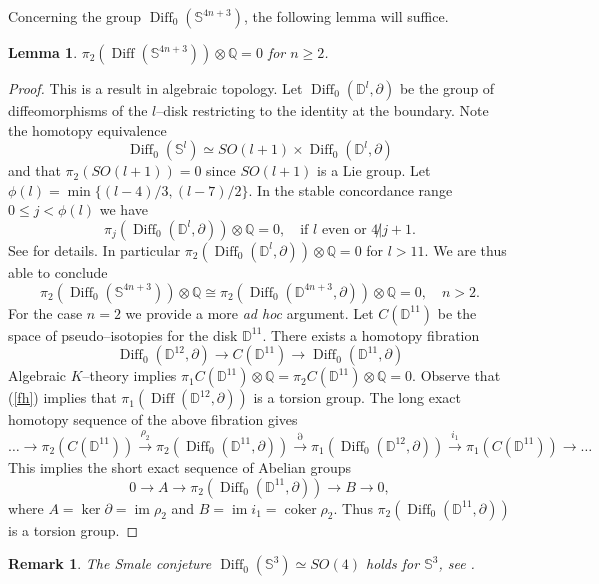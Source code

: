 \documentclass[10pt]{amsart}
\newtheorem{lemma}[proposition]{Lemma}
\newtheorem{remark}[proposition]{Remark}
\begin{document}
\noindent Concerning the group ${\operatorname{Diff}}_0({\mathbb{S}}^{4n+3})$, the following lemma will suffice.
\begin{lemma}\label{lem:tor}
$\pi_2({\operatorname{Diff}}({\mathbb{S}}^{4n+3}))\otimes{\mathbb{Q}}=0$ for $n\geq 2$.
\end{lemma}
\begin{proof}
This is a result in algebraic topology. Let ${\operatorname{Diff}}_0({\mathbb{D}}^l,\partial)$ be the group of diffeomorphisms of the $l$--disk restricting to the identity at the boundary. Note the homotopy equivalence
$${\operatorname{Diff}}_0({\mathbb{S}}^l)\simeq SO(l+1)\times{\operatorname{Diff}}_0({\mathbb{D}}^l,\partial)$$
and that $\pi_2(SO(l+1))=0$ since $SO(l+1)$ is a Lie group. Let $\phi(l)=\min\{(l-4)/3,(l-7)/2\}$. In the stable concordance range $0\leq j<\phi(l)$ we have
\begin{equation}\label{fh}
\pi_j({\operatorname{Diff}}_0({\mathbb{D}}^l,\partial))\otimes{\mathbb{Q}}=0,\quad\mbox{if }l\mbox{ even or }4\not|j+1.
\end{equation}
See \cite{We} for details. In particular $\pi_2({\operatorname{Diff}}_0({\mathbb{D}}^l,\partial))\otimes{\mathbb{Q}}=0$ for $l>11$. We are thus able to conclude
$$\pi_2({\operatorname{Diff}}_0({\mathbb{S}}^{4n+3}))\otimes{\mathbb{Q}}\cong\pi_2({\operatorname{Diff}}_0({\mathbb{D}}^{4n+3},\partial))\otimes{\mathbb{Q}}=0,\quad n>2.$$
For the case $n=2$ we provide a more {\it ad hoc} argument. Let $C({\mathbb{D}}^{11})$ be the space of pseudo--isotopies for the disk ${\mathbb{D}}^{11}$. There exists a homotopy fibration
$${\operatorname{Diff}}_0({\mathbb{D}}^{12},\partial)\longrightarrow C({\mathbb{D}}^{11})\longrightarrow{\operatorname{Diff}}_0({\mathbb{D}}^{11},\partial)$$
Algebraic $K$--theory implies $\pi_1C({\mathbb{D}}^{11})\otimes{\mathbb{Q}}=\pi_2C({\mathbb{D}}^{11})\otimes{\mathbb{Q}}=0$. Observe that (\ref{fh}) implies that $\pi_1({\operatorname{Diff}}({\mathbb{D}}^{12},\partial))$ is a torsion group. The long exact homotopy sequence of the above fibration gives
$$\ldots\longrightarrow\pi_2(C({\mathbb{D}}^{11}))\stackrel{\rho_2}{\longrightarrow}\pi_2({\operatorname{Diff}}_0({\mathbb{D}}^{11},\partial))\stackrel{\partial}{\longrightarrow}\pi_1({\operatorname{Diff}}_0({\mathbb{D}}^{12},\partial))\stackrel{i_1}{\longrightarrow}\pi_1(C({\mathbb{D}}^{11}))\longrightarrow\ldots$$
This implies the short exact sequence of Abelian groups
$$0\longrightarrow A\longrightarrow\pi_2({\operatorname{Diff}}_0({\mathbb{D}}^{11},\partial))\longrightarrow B\longrightarrow0,$$
where $A=\ker\partial={\operatorname{im}}\rho_2$ and $B={\operatorname{im}} i_1={\operatorname{coker}}\rho_2$. Thus $\pi_2({\operatorname{Diff}}_0({\mathbb{D}}^{11},\partial))$ is a torsion group.
\end{proof}
\begin{remark}
The Smale conjeture ${\operatorname{Diff}}_0({\mathbb{S}}^3)\simeq SO(4)$ holds for ${\mathbb{S}}^3$, see \cite{Ha}.
\end{remark}
\end{document}

